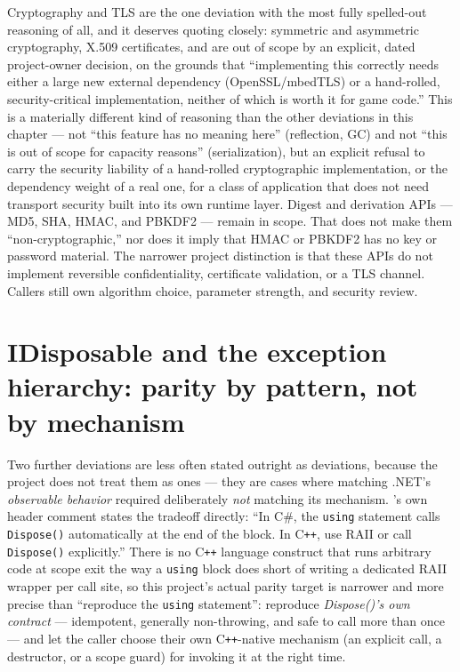 Cryptography and TLS are the one deviation with the most fully spelled-out reasoning of all,
and it deserves quoting closely: symmetric and asymmetric cryptography, X.509 certificates,
and  are out of scope by an explicit, dated project-owner decision, on the
grounds that ``implementing this correctly needs either a large new external dependency
(OpenSSL/mbedTLS) or a hand-rolled, security-critical implementation, neither of which is
worth it for game code.'' This is a materially different kind of reasoning than the other
deviations in this chapter --- not ``this feature has no meaning here'' (reflection, GC) and
not ``this is out of scope for capacity reasons'' (serialization), but an explicit refusal to
carry the security liability of a hand-rolled cryptographic implementation, or the dependency
weight of a real one, for a class of application that does not need transport security built
into its own runtime layer. Digest and derivation APIs --- MD5, SHA, HMAC, and PBKDF2 ---
remain in scope. That does not make them ``non-cryptographic,'' nor does it imply that HMAC or
PBKDF2 has no key or password material. The narrower project distinction is that these APIs
do not implement reversible confidentiality, certificate validation, or a TLS channel.
Callers still own algorithm choice, parameter strength, and security review.

\section{IDisposable and the exception hierarchy: parity by pattern, not by mechanism}

Two further deviations are less often stated outright as deviations, because the project
does not treat them as ones --- they are cases where matching .NET's \emph{observable
behavior} required deliberately \emph{not} matching its mechanism. 's
own header comment states the tradeoff directly: ``In C\#, the \texttt{using} statement calls
\texttt{Dispose()} automatically at the end of the block. In C\texttt{++}, use RAII or call
\texttt{Dispose()} explicitly.'' There is no C\texttt{++} language construct that runs
arbitrary code at scope exit the way a \texttt{using} block does short of writing a dedicated
RAII wrapper per call site, so this project's actual parity target is narrower and more
precise than ``reproduce the \texttt{using} statement'': reproduce \emph{Dispose()'s own
contract} --- idempotent, generally non-throwing, and safe to call more than once --- and let the
caller choose their own C\texttt{++}-native mechanism (an explicit call, a destructor, or a
scope guard) for invoking it at the right time.

